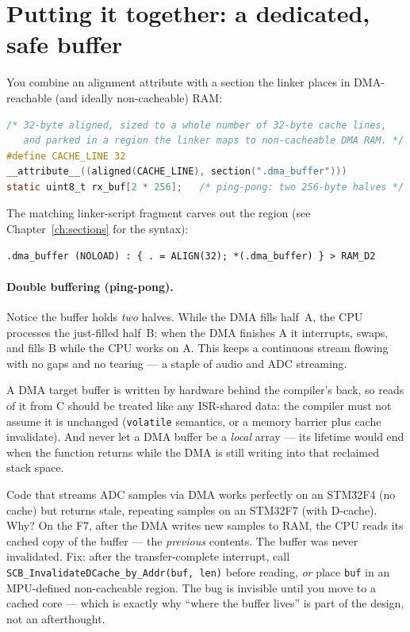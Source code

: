 \documentclass[11pt,a4paper,oneside]{book}
\newcommand{\code}[1]{\texttt{#1}}
\begin{document}
\section{Putting it together: a dedicated, safe buffer}
You combine an alignment attribute with a section the linker places in
DMA-reachable (and ideally non-cacheable) RAM:
\begin{lstlisting}[language=C,caption={A correctly placed, aligned DMA buffer.}]
/* 32-byte aligned, sized to a whole number of 32-byte cache lines,
   and parked in a region the linker maps to non-cacheable DMA RAM. */
#define CACHE_LINE 32
__attribute__((aligned(CACHE_LINE), section(".dma_buffer")))
static uint8_t rx_buf[2 * 256];   /* ping-pong: two 256-byte halves */
\end{lstlisting}
The matching linker-script fragment carves out the region (see
Chapter~\ref{ch:sections} for the syntax):
\begin{lstlisting}[style=shell]
.dma_buffer (NOLOAD) : { . = ALIGN(32); *(.dma_buffer) } > RAM_D2
\end{lstlisting}

\paragraph{Double buffering (ping-pong).}
Notice the buffer holds \emph{two} halves. While the DMA fills half~A, the CPU
processes the just-filled half~B; when the DMA finishes A it interrupts, swaps,
and fills B while the CPU works on A. This keeps a continuous stream flowing
with no gaps and no tearing --- a staple of audio and ADC streaming.

\begin{warning}
A DMA target buffer is written by hardware behind the compiler's back, so
reads of it from C should be treated like any ISR-shared data: the compiler
must not assume it is unchanged (\code{volatile} semantics, or a memory barrier
plus cache invalidate). And never let a DMA buffer be a \emph{local} array ---
its lifetime would end when the function returns while the DMA is still writing
into that reclaimed stack space.
\end{warning}

\begin{wexample}
Code that streams ADC samples via DMA works perfectly on an STM32F4 (no cache)
but returns stale, repeating samples on an STM32F7 (with D-cache). Why? On the
F7, after the DMA writes new samples to RAM, the CPU reads its cached copy of
the buffer --- the \emph{previous} contents. The buffer was never invalidated.
Fix: after the transfer-complete interrupt, call
\code{SCB\_InvalidateDCache\_by\_Addr(buf, len)} before reading, \emph{or} place
\code{buf} in an MPU-defined non-cacheable region. The bug is invisible until you
move to a cached core --- which is exactly why ``where the buffer lives'' is part
of the design, not an afterthought.
\end{wexample}
\end{document}
